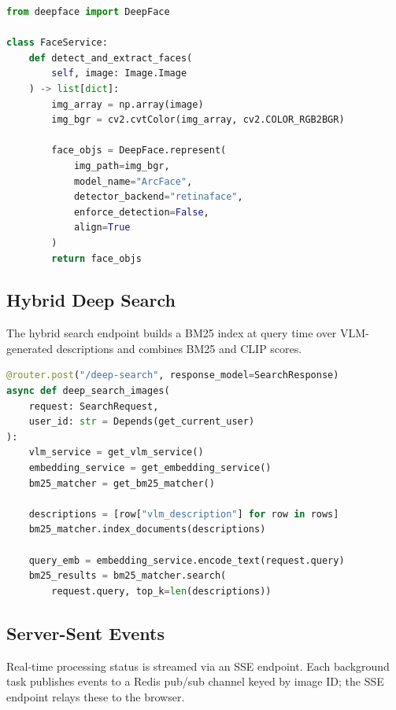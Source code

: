 \documentclass[12pt,a4paper,oneside]{report}
\begin{document}
\begin{lstlisting}[language=Python, caption={ArcFace face detection
  and extraction (face\_service.py)}]
from deepface import DeepFace

class FaceService:
    def detect_and_extract_faces(
        self, image: Image.Image
    ) -> list[dict]:
        img_array = np.array(image)
        img_bgr = cv2.cvtColor(img_array, cv2.COLOR_RGB2BGR)

        face_objs = DeepFace.represent(
            img_path=img_bgr,
            model_name="ArcFace",
            detector_backend="retinaface",
            enforce_detection=False,
            align=True
        )
        return face_objs
\end{lstlisting}

\subsection{Hybrid Deep Search}
The hybrid search endpoint builds a BM25 index at query time over
VLM-generated descriptions and combines BM25 and CLIP scores.

\begin{lstlisting}[language=Python, caption={Hybrid BM25 + CLIP deep
  search (search.py)}]
@router.post("/deep-search", response_model=SearchResponse)
async def deep_search_images(
    request: SearchRequest,
    user_id: str = Depends(get_current_user)
):
    vlm_service = get_vlm_service()
    embedding_service = get_embedding_service()
    bm25_matcher = get_bm25_matcher()

    descriptions = [row["vlm_description"] for row in rows]
    bm25_matcher.index_documents(descriptions)

    query_emb = embedding_service.encode_text(request.query)
    bm25_results = bm25_matcher.search(
        request.query, top_k=len(descriptions))
\end{lstlisting}

\subsection{Server-Sent Events}
Real-time processing status is streamed via an SSE endpoint.  Each
background task publishes events to a Redis pub/sub channel keyed by
image ID; the SSE endpoint relays these to the browser.
\end{document}
